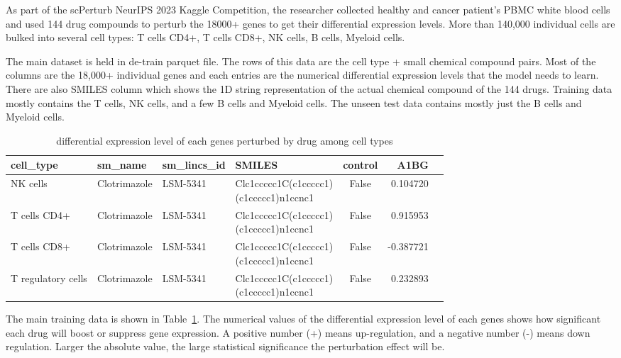 \documentclass[11pt, oneside]{article}   	%
\begin{document}
As part of the scPerturb NeurIPS 2023 Kaggle Competition, the researcher collected healthy and cancer patient's PBMC white blood cells and used 144 drug compounds to perturb the 18000+ genes to get their differential expression levels. More than 140,000 individual cells are bulked into several cell types: T cells CD4+, T cells CD8+, NK cells, B cells, Myeloid cells. 

The main dataset is held in de-train parquet file. The rows of this data are the cell type + small chemical compound pairs. Most of the columns are the 18,000+ individual genes and each entries are the numerical differential expression levels that the model needs to learn. There are also SMILES column which shows the 1D string representation of the actual chemical compound of the 144 drugs. Training data mostly contains the T cells, NK cells, and a few B cells and Myeloid cells. The unseen test data contains mostly just the B cells and Myeloid cells. 


\begin{table}[htbp]
\centering
\small
\begin{tabular}{|l|l|l|l|c|r|r|}
\hline
\textbf{cell\_type} & \textbf{sm\_name} & \textbf{sm\_lincs\_id} & \textbf{SMILES} & \textbf{control} & \textbf{A1BG} \\
\hline
NK cells & Clotrimazole & LSM-5341 & \makecell[l]{Clc1ccccc1C(c1ccccc1)\\(c1ccccc1)n1ccnc1} & False & 0.104720  \\
\hline
T cells CD4+ & Clotrimazole & LSM-5341 & \makecell[l]{Clc1ccccc1C(c1ccccc1)\\(c1ccccc1)n1ccnc1} & False & 0.915953 \\
\hline
T cells CD8+ & Clotrimazole & LSM-5341 & \makecell[l]{Clc1ccccc1C(c1ccccc1)\\(c1ccccc1)n1ccnc1} & False & -0.387721  \\
\hline
T regulatory cells & Clotrimazole & LSM-5341 & \makecell[l]{Clc1ccccc1C(c1ccccc1)\\(c1ccccc1)n1ccnc1} & False & 0.232893  \\
\hline
\end{tabular}
\caption{differential expression level of each genes perturbed by drug among cell types}
\label{tab:de_train}
\end{table}

The main training data is shown in Table~\ref{tab:de_train}. The numerical values of the differential expression level of each genes shows how significant each drug will boost or suppress  gene expression. A positive number (+) means up-regulation, and a negative  number (-) means down regulation. Larger the absolute value, the large statistical significance the perturbation effect will be. 
\end{document}
